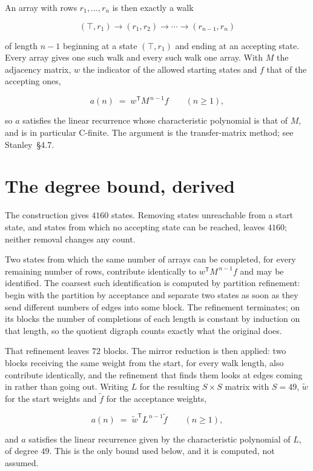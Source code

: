 \documentclass[11pt]{article}
\theoremstyle{definition}
\begin{document}
An array with rows $r_1,\dots,r_n$ is then exactly a walk

\[(\top,r_1) \to (r_1,r_2) \to \cdots \to (r_{n-1},r_n)\]

of length $n-1$ beginning at a state $(\top,r_1)$ and ending at an accepting state. Every array gives one such walk and every such walk one array. With $M$ the adjacency matrix, $w$ the indicator of the allowed starting states and $f$ that of the accepting ones,

\[a(n) \;=\; w^{\mathsf T} M^{\,n-1} f \qquad (n \ge 1),\]

so $a$ satisfies the linear recurrence whose characteristic polynomial is that of $M$, and is in particular C-finite. The argument is the transfer-matrix method; see Stanley~\S4.7.

\section{The degree bound, derived}

The construction gives $4160$ states. Removing states unreachable from a start state, and states from which no accepting state can be reached, leaves $4160$; neither removal changes any count.

Two states from which the same number of arrays can be completed, for every remaining number of rows, contribute identically to $w^{\mathsf T}M^{\,n-1}f$ and may be identified. The coarsest such identification is computed by partition refinement: begin with the partition by acceptance and separate two states as soon as they send different numbers of edges into some block. The refinement terminates; on its blocks the number of completions of each length is constant by induction on that length, so the quotient digraph counts exactly what the original does.

That refinement leaves $72$ blocks. The mirror reduction is then applied: two blocks receiving the same weight from the start, for every walk length, also contribute identically, and the refinement that finds them looks at edges coming in rather than going out. Writing $L$ for the resulting $S \times S$ matrix with $S = 49$, $\tilde w$ for the start weights and $\tilde f$ for the acceptance weights,

\[a(n) \;=\; \tilde w^{\mathsf T} L^{\,n-1} \tilde f \qquad (n \ge 1),\]

and $a$ satisfies the linear recurrence given by the characteristic polynomial of $L$, of degree $49$. This is the only bound used below, and it is computed, not assumed.
\end{document}
